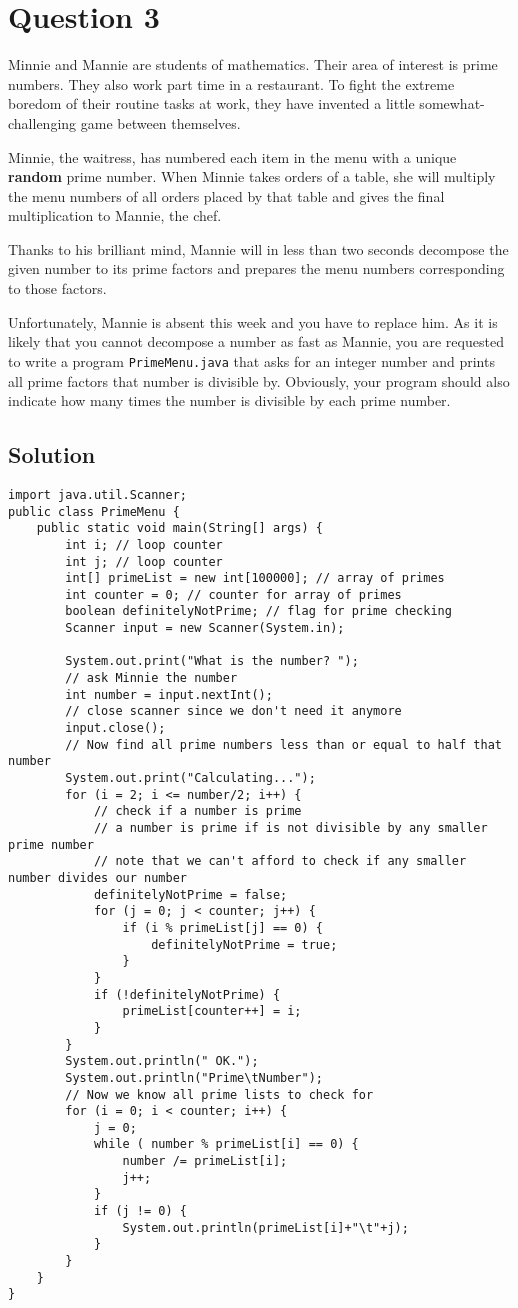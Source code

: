 \section*{Question 3}

Minnie and Mannie are students of mathematics. Their area of interest is prime numbers. They also work part time in a restaurant. To fight the extreme boredom of their routine tasks at work, they have invented a little somewhat-challenging game between themselves.

Minnie, the waitress, has numbered each item in the menu with a unique \textbf{random} prime number. When Minnie takes orders of a table, she will multiply the menu numbers of all orders placed by that table and gives the final multiplication to Mannie, the chef.

Thanks to his brilliant mind, Mannie will in less than two seconds decompose the given number to its prime factors and prepares the menu numbers corresponding to those factors.

Unfortunately, Mannie is absent this week and you have to replace him. As it is likely that you cannot decompose a number as fast as Mannie, you are requested to write a program \texttt{PrimeMenu.java} that asks for an integer number and prints all prime factors that number is divisible by. Obviously, your program should also indicate how many times the number is divisible by each prime number.

\subsection*{Solution}
\begin{lstlisting}
import java.util.Scanner;
public class PrimeMenu {
	public static void main(String[] args) {
		int i; // loop counter
		int j; // loop counter
		int[] primeList = new int[100000]; // array of primes
		int counter = 0; // counter for array of primes
		boolean definitelyNotPrime; // flag for prime checking
		Scanner input = new Scanner(System.in);

		System.out.print("What is the number? ");
		// ask Minnie the number
		int number = input.nextInt();
		// close scanner since we don't need it anymore
		input.close();
		// Now find all prime numbers less than or equal to half that number
		System.out.print("Calculating...");
		for (i = 2; i <= number/2; i++) {
			// check if a number is prime
			// a number is prime if is not divisible by any smaller prime number
			// note that we can't afford to check if any smaller number divides our number
			definitelyNotPrime = false;
			for (j = 0; j < counter; j++) {
				if (i % primeList[j] == 0) {
					definitelyNotPrime = true;
				}
			}
			if (!definitelyNotPrime) {
				primeList[counter++] = i;
			}
		}
		System.out.println(" OK.");
		System.out.println("Prime\tNumber");
		// Now we know all prime lists to check for
		for (i = 0; i < counter; i++) {
			j = 0;
			while ( number % primeList[i] == 0) {
				number /= primeList[i];
				j++;
			}
			if (j != 0) {
				System.out.println(primeList[i]+"\t"+j);
			}
		}
	}
}
\end{lstlisting}

